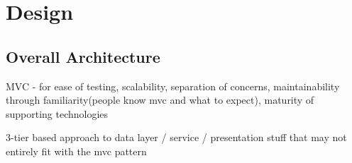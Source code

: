 \chapter{Design}




 


\section{Overall Architecture}

MVC - for ease of testing, scalability, separation of concerns, maintainability through familiarity(people know mvc and what to expect), maturity of supporting technologies

3-tier based approach to data layer / service / presentation stuff that may not entirely fit with the mvc pattern

